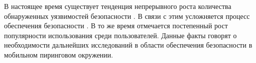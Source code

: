 %
В настоящее время существует тенденция непрерывного роста количества обнаруженных уязвимостей безопасности . 
%
В связи с этим усложняется процесс обеспечения безопасности . 
%
В то же время отмечается постепенный рост популярности использования  среди пользователей. 
%
Данные факты говорят о необходимости дальнейших исследований в области обеспечения безопасности  в мобильном пиринговом окружении. 